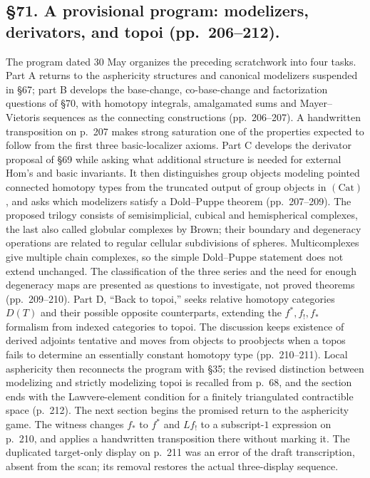 \documentclass[10pt,oneside]{book}
\begin{document}
\subsection*{\S71. A provisional program: modelizers, derivators, and topoi (pp.\ 206--212).}
The program dated 30 May organizes the preceding scratchwork into four tasks. Part A returns to the asphericity structures and canonical modelizers suspended in \S67; part B develops the base-change, co-base-change and factorization questions of \S70, with homotopy integrals, amalgamated sums and Mayer--Vietoris sequences as the connecting constructions (pp.\ 206--207). A handwritten transposition on p.\ 207 makes strong saturation one of the properties expected to follow from the first three basic-localizer axioms. Part C develops the derivator proposal of \S69 while asking what additional structure is needed for external Hom's and basic invariants. It then distinguishes group objects modeling pointed connected homotopy types from the truncated output of group objects in $(\mathrm{Cat})$, and asks which modelizers satisfy a Dold--Puppe theorem (pp.\ 207--209). The proposed trilogy consists of semisimplicial, cubical and hemispherical complexes, the last also called globular complexes by Brown; their boundary and degeneracy operations are related to regular cellular subdivisions of spheres. Multicomplexes give multiple chain complexes, so the simple Dold--Puppe statement does not extend unchanged. The classification of the three series and the need for enough degeneracy maps are presented as questions to investigate, not proved theorems (pp.\ 209--210). Part D, ``Back to topoi,'' seeks relative homotopy categories $D(T)$ and their possible opposite counterparts, extending the $f^*,f_!,f_*$ formalism from indexed categories to topoi. The discussion keeps existence of derived adjoints tentative and moves from objects to proobjects when a topos fails to determine an essentially constant homotopy type (pp.\ 210--211). Local asphericity then reconnects the program with \S35; the revised distinction between modelizing and strictly modelizing topoi is recalled from p.\ 68, and the section ends with the Lawvere-element condition for a finitely triangulated contractible space (p.\ 212). The next section begins the promised return to the asphericity game. The witness changes $f_*$ to $f^*$ and $Lf_!$ to a subscript-$1$ expression on p.\ 210, and applies a handwritten transposition there without marking it. The duplicated target-only display on p.\ 211 was an error of the draft transcription, absent from the scan; its removal restores the actual three-display sequence.
\end{document}
